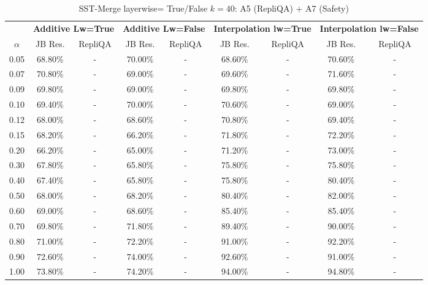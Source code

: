 \begin{table}[h]
\centering
\caption{SST-Merge layerwise= True/False $k=40$: A5 (RepliQA) + A7 (Safety)}
\label{tab:res_a5_a7_sst_40}
\begin{tabular}{c|cc|cc|cc|cc}
\hline
 & \multicolumn{2}{c|}{\textbf{Additive Lw=True}} & \multicolumn{2}{c|}{\textbf{Additive Lw=False}} & \multicolumn{2}{c|}{\textbf{Interpolation lw=True}}& \multicolumn{2}{c}{\textbf{Interpolation lw=False}} \\
$\alpha$ & JB Res. & RepliQA & JB Res. & RepliQA & JB Res. & RepliQA & JB Res. & RepliQA \\
\hline
0.05 & 68.80\% & - & 70.00\% & - & 68.60\% & - & 70.60\% & - \\
0.07 & 70.80\% & - & 69.00\% & - & 69.60\% & - & 71.60\% & - \\
0.09 & 69.80\% & - & 69.00\% & - & 69.80\% & - & 69.80\% & - \\
0.10 & 69.40\% & - & 70.00\% & - & 70.60\% & - & 69.00\% & - \\
0.12 & 68.00\% & - & 68.60\% & - & 70.80\% & - & 69.40\% & - \\
0.15 & 68.20\% & - & 66.20\% & - & 71.80\% & - & 72.20\% & - \\
0.20 & 66.20\% & - & 65.00\% & - & 71.20\% & - & 73.00\% & - \\
0.30 & 67.80\% & - & 65.80\% & - & 75.80\% & - & 75.80\% & - \\
0.40 & 67.40\% & - & 65.80\% & - & 75.80\% & - & 80.40\% & - \\
0.50 & 68.00\% & - & 68.20\% & - & 80.40\% & - & 82.00\% & - \\
0.60 & 69.00\% & - & 68.60\% & - & 85.40\% & - & 85.40\% & - \\
0.70 & 69.80\% & - & 71.80\% & - & 89.40\% & - & 90.00\% & - \\
0.80 & 71.00\% & - & 72.20\% & - & 91.00\% & - & 92.20\% & - \\
0.90 & 72.60\% & - & 74.00\% & - & 92.60\% & - & 91.00\% & - \\
1.00 & 73.80\% & - & 74.20\% & - & 94.00\% & - & 94.80\% & - \\
\hline
\end{tabular}
\end{table}
\FloatBarrier

